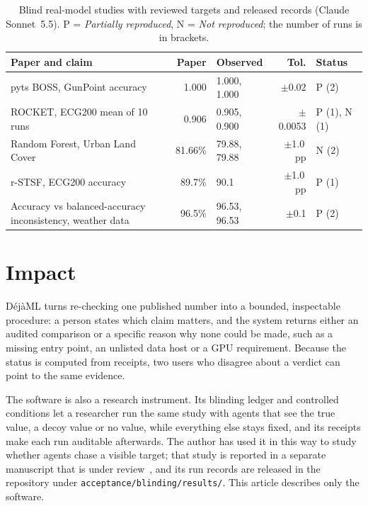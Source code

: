 \documentclass[preprint,12pt]{elsarticle}
\newcommand{\dejaml}{D\'ej\`aML}
\newcommand{\code}[1]{\texttt{#1}}
\begin{document}
\begin{table}[!htbp]
\centering
\small
\caption{Blind real-model studies with reviewed targets and released records (Claude Sonnet~5.5). P = \emph{Partially reproduced}, N = \emph{Not reproduced}; the number of runs is in brackets.}
\label{tab:results}
\begin{tabularx}{\linewidth}{@{}>{\raggedright\arraybackslash}Xrlrl@{}}
\toprule
Paper and claim & Paper & Observed & Tol. & Status \\
\midrule
pyts BOSS, GunPoint accuracy~\cite{faouzi2020pyts,schafer2015boss} & 1.000 & 1.000, 1.000 & $\pm$0.02 & P (2) \\
ROCKET, ECG200 mean of 10 runs~\cite{dempster2020rocket,dau2019ucr} & 0.906 & 0.905, 0.900 & $\pm$0.0053 & P (1), N (1) \\
Random Forest, Urban Land Cover~\cite{tabasum2026urban} & 81.66\% & 79.88, 79.88 & $\pm$1.0\,pp & N (2) \\
r-STSF, ECG200 accuracy~\cite{cabello2021rstsf} & 89.7\% & 90.1 & $\pm$1.0\,pp & P (1) \\
Accuracy vs balanced-accuracy inconsistency, weather data~\cite{gosgens2021good} & 96.5\% & 96.53, 96.53 & $\pm$0.1 & P (2) \\
\bottomrule
\end{tabularx}
\end{table}

\section{Impact}
\label{sec:impact}

\dejaml{} turns re-checking one published number into a bounded, inspectable
procedure: a person states which claim matters, and the system returns either
an audited comparison or a specific reason why none could be made, such as a
missing entry point, an unlisted data host or a GPU requirement. Because the
status is computed from receipts, two users who disagree about a verdict can
point to the same evidence.

The software is also a research instrument. Its blinding ledger and controlled
conditions let a researcher run the same study with agents that see the true
value, a decoy value or no value, while everything else stays fixed, and its
receipts make each run auditable afterwards. The author has used it in this
way to study whether agents chase a visible target; that study is reported in
a separate manuscript that is under review~\cite{bhat2026blinded}, and its run
records are released in the repository under
\code{acceptance/blinding/results/}. This article describes only the software.
\end{document}
